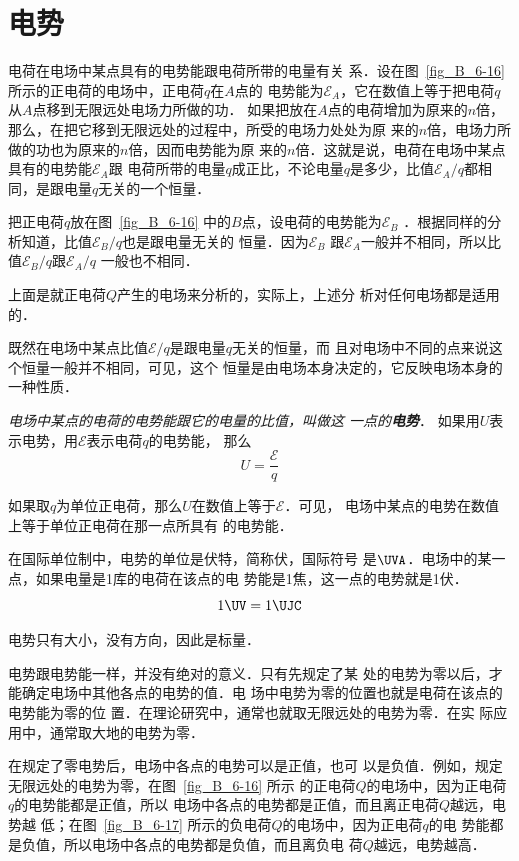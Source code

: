 \section{电势}
电荷在电场中某点具有的电势能跟电荷所带的电量有关
系．设在图~\ref{fig_B_6-16} 所示的正电荷的电场中，正电荷$q$在$A$点的
电势能为$\mathcal{E}_A$，它在数值上等于把电荷$q$从$A$点移到无限远处电场力所做的功．
如果把放在$A$点的电荷增加为原来的$n$倍，
那么，在把它移到无限远处的过程中，所受的电场力处处为原
来的$n$倍，电场力所做的功也为原来的$n$倍，因而电势能为原
来的$n$倍．这就是说，电荷在电场中某点具有的电势能$\mathcal{E}_A$跟
电荷所带的电量$q$成正比，不论电量$q$是多少，比值$\mathcal{E}_A/q$都相
同，是跟电量$q$无关的一个恒量．

把正电荷$q$放在图~\ref{fig_B_6-16} 中的$B$点，设电荷的电势能为$\mathcal{E}_B$
．根据同样的分析知道，比值$\mathcal{E}_B/q$也是跟电量无关的
恒量．因为$\mathcal{E}_B$
跟$\mathcal{E}_A$一般并不相同，所以比值$\mathcal{E}_B/q$跟$\mathcal{E}_A/q$
一般也不相同．

上面是就正电荷$Q$产生的电场来分析的，实际上，上述分
析对任何电场都是适用的．

既然在电场中某点比值$\mathcal{E}/q$是跟电量$q$无关的恒量，而
且对电场中不同的点来说这个恒量一般并不相同，可见，这个
恒量是由电场本身决定的，它反映电场本身的一种性质．

\textit{电场中某点的电荷的电势能跟它的电量的比值，叫做这
一点的\textbf{电势}}．
如果用$U$表示电势，用$\mathcal{E}$表示电荷$q$的电势能，
那么
\[U=\frac{\mathcal{E}}{q} \]

如果取$q$为单位正电荷，那么$U$在数值上等于$\mathcal{E}$．可见，
电场中某点的电势在数值上等于单位正电荷在那一点所具有
的电势能．

在国际单位制中，电势的单位是伏特，简称伏，国际符号
是$\UVA$．电场中的某一点，如果电量是1库的电荷在该点的电
势能是1焦，这一点的电势就是1伏．
\[ 1 \UV =1 \UJC \]

电势只有大小，没有方向，因此是标量．

电势跟电势能一样，并没有绝对的意义．只有先规定了某
处的电势为零以后，才能确定电场中其他各点的电势的值．电
场中电势为零的位置也就是电荷在该点的电势能为零的位
置．在理论研究中，通常也就取无限远处的电势为零．在实
际应用中，通常取大地的电势为零．

在规定了零电势后，电场中各点的电势可以是正值，也可
以是负值．例如，规定无限远处的电势为零，在图~\ref{fig_B_6-16} 所示
的正电荷$Q$的电场中，因为正电荷$q$的电势能都是正值，所以
电场中各点的电势都是正值，而且离正电荷$Q$越远，电势越
低；在图~\ref{fig_B_6-17} 所示的负电荷$Q$的电场中，因为正电荷$q$的电
势能都是负值，所以电场中各点的电势都是负值，而且离负电
荷$Q$越远，电势越高．

